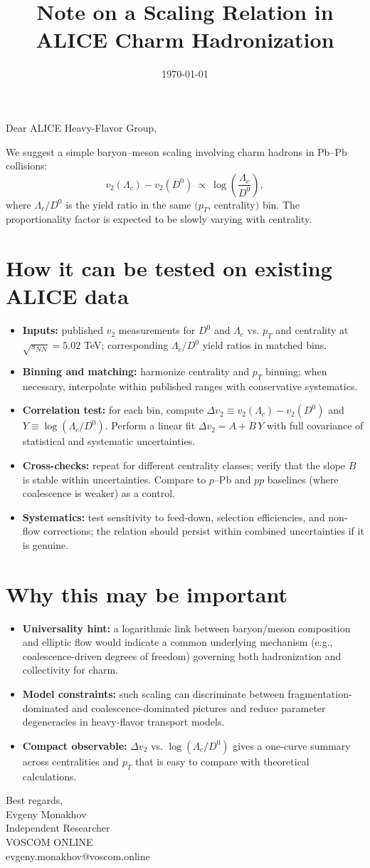 \documentclass[a4paper,12pt]{article}
\title{Note on a Scaling Relation in ALICE Charm Hadronization}
\author{}
\date{\today}
\begin{document}
\maketitle
{}

Dear ALICE Heavy-Flavor Group,

We suggest a simple baryon--meson scaling involving charm hadrons in Pb--Pb collisions:
\[
v_2(\Lambda_c) - v_2(D^0) \ \propto\  \log\!\left(\frac{\Lambda_c}{D^0}\right),
\]
where $\Lambda_c/D^0$ is the yield ratio in the same $(p_T,\,$centrality$)$ bin. The proportionality factor is expected to be slowly varying with centrality.

\section*{How it can be tested on existing ALICE data}
\begin{itemize}
  \item \textbf{Inputs:} published $v_2$ measurements for $D^0$ and $\Lambda_c$ vs. $p_T$ and centrality at $\sqrt{s_{NN}}=5.02$ TeV; corresponding $\Lambda_c/D^0$ yield ratios in matched bins.
  \item \textbf{Binning and matching:} harmonize centrality and $p_T$ binning; when necessary, interpolate within published ranges with conservative systematics.
  \item \textbf{Correlation test:} for each bin, compute $\Delta v_2 \equiv v_2(\Lambda_c)-v_2(D^0)$ and $Y \equiv \log(\Lambda_c/D^0)$. Perform a linear fit $\Delta v_2 = A + B\,Y$ with full covariance of statistical and systematic uncertainties.
  \item \textbf{Cross-checks:} repeat for different centrality classes; verify that the slope $B$ is stable within uncertainties. Compare to $p$--Pb and $pp$ baselines (where coalescence is weaker) as a control.
  \item \textbf{Systematics:} test sensitivity to feed-down, selection efficiencies, and non-flow corrections; the relation should persist within combined uncertainties if it is genuine.
\end{itemize}

\section*{Why this may be important}
\begin{itemize}
  \item \textbf{Universality hint:} a logarithmic link between baryon/meson composition and elliptic flow would indicate a common underlying mechanism (e.g., coalescence-driven degrees of freedom) governing both hadronization and collectivity for charm.
  \item \textbf{Model constraints:} such scaling can discriminate between fragmentation-dominated and coalescence-dominated pictures and reduce parameter degeneracies in heavy-flavor transport models.
  \item \textbf{Compact observable:} $\Delta v_2$ vs. $\log(\Lambda_c/D^0)$ gives a one-curve summary across centralities and $p_T$ that is easy to compare with theoretical calculations.
\end{itemize}

\bigskip
Best regards, \\
Evgeny Monakhov \\
Independent Researcher \\
VOSCOM ONLINE \\
evgeny.monakhov@voscom.online
\end{document}
